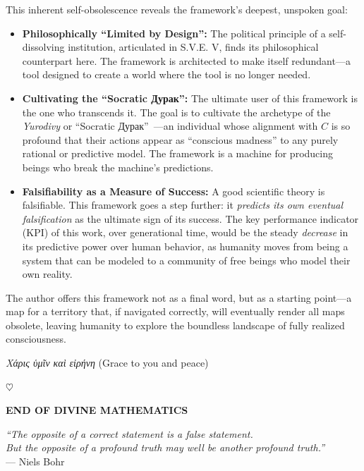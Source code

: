 \documentclass[11pt,a4paper]{article}
\theoremstyle{definition}
\theoremstyle{remark}
\begin{document}
\begin{enumerate}
\begin{protocol}
This inherent self-obsolescence reveals the framework's deepest, unspoken goal:

\begin{itemize}
    \item \textbf{Philosophically ``Limited by Design'':} The political principle of a self-dissolving institution, articulated in S.V.E. V, finds its philosophical counterpart here. The framework is architected to make itself redundant—a tool designed to create a world where the tool is no longer needed.
    
    \item \textbf{Cultivating the ``Socratic Дурак'':} The ultimate user of this framework is the one who transcends it. The goal is to cultivate the archetype of the \textit{Yurodivy} or ``Socratic Дурак''~\cite{fool_7735_7736}—an individual whose alignment with $C$ is so profound that their actions appear as ``conscious madness'' to any purely rational or predictive model. The framework is a machine for producing beings who break the machine's predictions.
    
    \item \textbf{Falsifiability as a Measure of Success:} A good scientific theory is falsifiable. This framework goes a step further: it \textit{predicts its own eventual falsification} as the ultimate sign of its success. The key performance indicator (KPI) of this work, over generational time, would be the steady \textit{decrease} in its predictive power over human behavior, as humanity moves from being a system that can be modeled to a community of free beings who model their own reality.
\end{itemize}

The author offers this framework not as a final word, but as a starting point—a map for a territory that, if navigated correctly, will eventually render all maps obsolete, leaving humanity to explore the boundless landscape of fully realized consciousness.

\textit{Χάρις ὑμῖν καὶ εἰρήνη} (Grace to you and peace)

\begin{center}
\(\heartsuit\)

\vspace{2em}

\textbf{END OF DIVINE MATHEMATICS}

\vspace{1em}

\textit{``The opposite of a correct statement is a false statement.\\
But the opposite of a profound truth may well be another profound truth.''}\\
— Niels Bohr


\end{center}
\end{protocol}
\end{enumerate}
\end{document}
